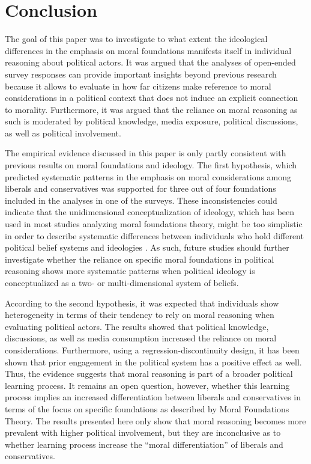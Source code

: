\documentclass[12pt]{article}
\begin{document}
\section{Conclusion}

The goal of this paper was to investigate to what extent the ideological differences in the emphasis on moral foundations manifests itself in individual reasoning about political actors. It was argued that the analyses of open-ended survey responses can provide important insights beyond previous research because it allows to evaluate in how far citizens make reference to moral considerations in a political context that does not induce an explicit connection to morality. Furthermore, it was argued that the reliance on moral reasoning as such is moderated by political knowledge, media exposure, political discussions, as well as political involvement.

The empirical evidence discussed in this paper is only partly consistent with previous results on moral foundations and ideology. The first hypothesis, which predicted systematic patterns in the emphasis on moral considerations among liberals and conservatives was supported for three out of four foundations included in the analyses in one of the surveys. These inconsistencies could indicate that the unidimensional conceptualization of ideology, which has been used in most studies analyzing moral foundations theory, might be too simplistic in order to describe systematic differences between individuals who hold different political belief systems and ideologies \citep[see for example][]{feldman2013understanding}. As such, future studies should further investigate whether the reliance on specific moral foundations in political reasoning shows more systematic patterns when political ideology is conceptualized as a two- or multi-dimensional system of beliefs.

According to the second hypothesis, it was expected that individuals show heterogeneity in terms of their tendency to rely on moral reasoning when evaluating political actors. The results showed that political knowledge, discussions, as well as media consumption increased the reliance on moral considerations. Furthermore, using a regression-discontinuity design, it has been shown that prior engagement in the political system has a positive effect as well. Thus, the evidence suggests that moral reasoning is part of a broader political learning process. It remains an open question, however, whether this learning process implies an increased differentiation between liberals and conservatives in terms of the focus on specific foundations as described by Moral Foundations Theory. The results presented here only show that moral reasoning becomes more prevalent with higher political involvement, but they are inconclusive as to whether learning process increase the ``moral differentiation'' of liberals and conservatives.
\end{document}
